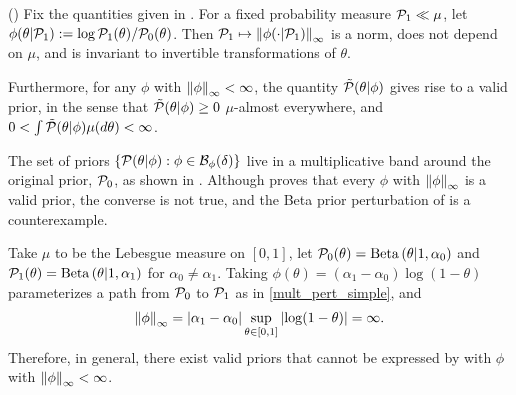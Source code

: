 \begin{lem}
%
(\citet{gustafson:1996:local})
%
Fix the quantities given in .  For a fixed probability
measure $\mathcal{P}_{1} \ll \mu$, let $\phi(\theta \vert \mathcal{P}_{1}) := \log \mathcal{P}_{1}(\theta) /
\mathcal{P}_{0}(\theta)$.  Then $\mathcal{P}_{1} \mapsto \left\Vert\phi(\cdot \vert \mathcal{P}_{1})\right\Vert_{\infty}$ is a
norm, does not depend on $\mu$, and is invariant to invertible transformations
of $\theta$.

Furthermore, for any $\phi$ with $\left\Vert\phi\right\Vert_{\infty} < \infty$, the quantity
$\tilde{\mathcal{P}}(\theta \vert \phi)$ gives rise to a valid prior, in the sense that
$\tilde{\mathcal{P}}(\theta \vert \phi) \ge 0$ $\mu$-almost everywhere, and
$0 < \int \tilde{\mathcal{P}}(\theta \vert \phi) \mu(d\theta) < \infty$.
%
%
\end{lem}

The set of priors $\left\{\mathcal{P}(\theta \vert \phi) : \phi \in
\mathcal{B}_\phi(\delta)\right\}$ live in a multiplicative band around the original
prior, $\mathcal{P}_{0}$, as shown in . Although
 proves that every $\phi$ with $\left\Vert\phi\right\Vert_{\infty}$ is a
valid prior, the converse is not true, and the Beta prior perturbation of
 is a counterexample.


\begin{ex}
%
Take $\mu$ to be the Lebesgue measure on $[0,1]$, let $\mathcal{P}_{0}(\theta) =
\mathrm{Beta}\left(\theta \vert 1, \alpha_0\right)$ and $\mathcal{P}_{1}(\theta) = \mathrm{Beta}\left(\theta \vert
1, \alpha_1\right)$ for $\alpha_0 \ne \alpha_1$.  Taking
$\phi(\theta) = (\alpha_1 - \alpha_0) \log(1 - \theta)$ parameterizes
a path from $\mathcal{P}_{0}$ to $\mathcal{P}_{1}$ as in \eqref{mult_pert_simple}, and
%
\begin{align*}
%
\norminf{\phi} =
    \abs{\alpha_1 - \alpha_0} \sup_{\theta \in [0,1]} \abs{\log(1 - \theta)} =
    \infty.
%
\end{align*}
%
Therefore, in general, there exist valid priors that cannot be expressed by
 with $\phi$ with $\left\Vert\phi\right\Vert_{\infty} < \infty$.
%
\end{ex}

